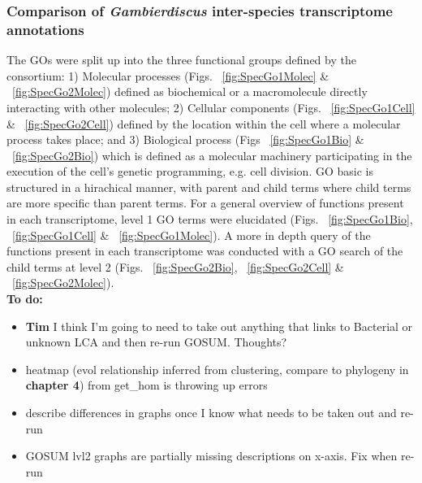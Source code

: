 \documentclass[12pt]{article}
\begin{document}
\subsubsection*{Comparison of \emph{Gambierdiscus} inter-species transcriptome annotations}
\FloatBarrier

The GOs were split up into the three functional groups defined by the consortium: 1) Molecular processes (Figs. ~\ref{fig:SpecGo1Molec} \& ~\ref{fig:SpecGo2Molec}) defined as biochemical or a macromolecule directly interacting with other molecules; 2) Cellular components (Figs. ~\ref{fig:SpecGo1Cell} \& ~\ref{fig:SpecGo2Cell}) defined by the location within the cell where a molecular process takes place; and 3) Biological process (Figs ~\ref{fig:SpecGo1Bio} \& ~\ref{fig:SpecGo2Bio}) which is defined as a molecular machinery participating in the execution of the cell's genetic programming, e.g. cell division.
GO basic is structured in a hirachical manner, with parent and child terms where child terms are more specific than parent terms. 
For a general overview of functions present in each transcriptome, level 1 GO terms were elucidated (Figs. ~\ref{fig:SpecGo1Bio}, ~\ref{fig:SpecGo1Cell} \& ~\ref{fig:SpecGo1Molec}). 
A more in depth query of the functions present in each transcriptome was conducted with a GO search of the child terms at level 2 (Figs. ~\ref{fig:SpecGo2Bio}, ~\ref{fig:SpecGo2Cell} \& ~\ref{fig:SpecGo2Molec}). \\
\textbf{To do:}
\begin{itemize}
\item \textbf{Tim} I think I'm going to need to take out anything that links to Bacterial or unknown LCA and then re-run GOSUM. Thoughts?
\item heatmap (evol relationship inferred from clustering, compare to phylogeny in \textbf{chapter 4}) from get\_hom is throwing up errors
\item describe differences in graphs once I know what needs to be taken out and re-run
\item GOSUM lvl2 graphs are partially missing descriptions on x-axis. Fix when re-run
\end{itemize}
\end{document}
